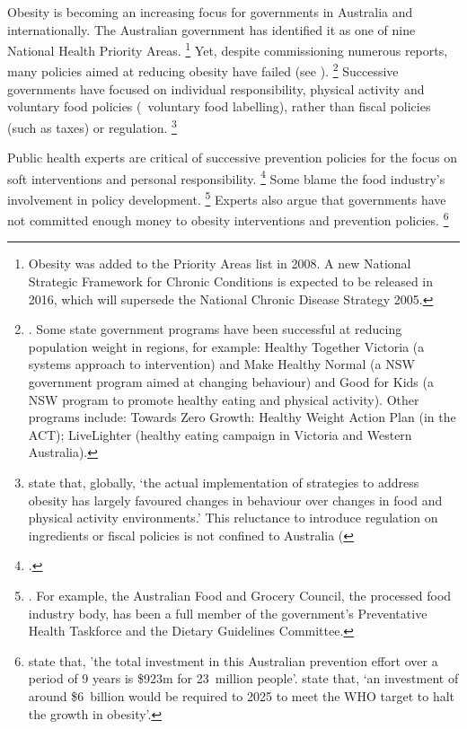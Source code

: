 \documentclass[embargoed]{grattan}
\begin{document}
Obesity is becoming an increasing focus for governments in Australia and internationally.
The Australian government has identified it as one of nine National Health Priority Areas.%
\footnote{Obesity was added to the Priority Areas list in 2008.
A new National Strategic Framework for Chronic Conditions is expected to be released in 2016, which will supersede the National Chronic Disease Strategy 2005.} Yet, despite commissioning numerous reports, many policies aimed at reducing obesity have failed (see ).%
\footnote{\textcite{Swinburn2013Progressobesityprevention}.
Some state government programs have been successful at reducing population weight in regions, for example: Healthy Together Victoria (a systems approach to intervention) and Make Healthy Normal (a NSW government program aimed at changing behaviour) and Good for Kids (a NSW program to promote healthy eating and physical activity). Other programs include: Towards Zero Growth: Healthy Weight Action Plan (in the ACT); LiveLighter (healthy eating campaign in Victoria and Western Australia).} Successive governments have focused on individual responsibility, physical activity and voluntary food policies (\eg~voluntary food labelling), rather than fiscal policies (such as taxes) or regulation.%
\footnote{\textcite{Roberto2015Patchyprogressobesity} state that, globally, `the actual implementation of strategies to address obesity has largely favoured changes in behaviour over changes in food and physical activity environments.' This reluctance to introduce regulation on ingredients or fiscal policies is not confined to Australia (\textcites{Swinburn2013Progressobesityprevention}{Capacci2012Policiespromotehealthy}}

Public health experts are critical of successive prevention policies for the focus on soft interventions and personal responsibility.%
\footcites{Capacci2012Policiespromotehealthy}{Swinburn2013Progressobesityprevention}{Australia2015NoTimeWeight} Some blame the food industry's involvement in policy development.%
\footnote{\textcites{Swinburn2013Progressobesityprevention}{Roberto2015Patchyprogressobesity}{Brownell2009perilsignoringhistory}.
For example, the Australian Food and Grocery Council, the processed food industry body, has been a full member of the government's Preventative Health Taskforce and the Dietary Guidelines Committee.} Experts also argue that governments have not committed enough money to obesity interventions and prevention policies.%
\footnote{\textcite{Swinburn2013Progressobesityprevention} state that, 'the total investment in this Australian prevention effort over a period of 9 years is \$923m for 23~million people'. \textcite{Australia2015NoTimeWeight} state that, `an investment of around \$6~billion would be required to 2025 to meet the WHO target to halt the growth in obesity'.}
\end{document}
